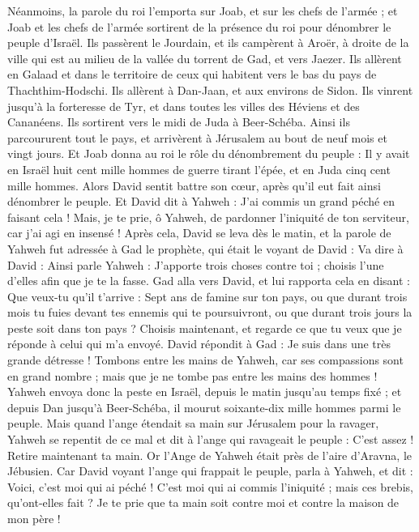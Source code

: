 \begin{multicols}{2}
Néanmoins, la parole du roi l’emporta sur Joab, et sur les chefs de l'armée ; et Joab et les chefs de l'armée sortirent de la présence du roi pour dénombrer le peuple d’Israël.
Ils passèrent le Jourdain, et ils campèrent à Aroër, à droite de la ville qui est au milieu de la vallée du torrent de Gad, et vers Jaezer.
Ils allèrent en Galaad et dans le territoire de ceux qui habitent vers le bas du pays de Thachthim-Hodschi. Ils allèrent à Dan-Jaan, et aux environs de Sidon.
Ils vinrent jusqu'à la forteresse de Tyr, et dans toutes les villes des Héviens et des Cananéens. Ils sortirent vers le midi de Juda à Beer-Schéba.
Ainsi ils parcoururent tout le pays, et arrivèrent à Jérusalem au bout de neuf mois et vingt jours.
Et Joab donna au roi le rôle du dénombrement du peuple : Il y avait en Israël huit cent mille hommes de guerre tirant l'épée, et en Juda cinq cent mille hommes.
Alors David sentit battre son cœur, après qu'il eut fait ainsi dénombrer le peuple. Et David dit à Yahweh : J'ai commis un grand péché en faisant cela ! Mais, je te prie, ô Yahweh, de pardonner l'iniquité de ton serviteur, car j'ai agi en insensé !
Après cela, David se leva dès le matin, et la parole de Yahweh fut adressée à Gad le prophète, qui était le voyant de David :
Va dire à David : Ainsi parle Yahweh : J’apporte trois choses contre toi ; choisis l'une d’elles afin que je te la fasse.
Gad alla vers David, et lui rapporta cela en disant : Que veux-tu qu’il t'arrive : Sept ans de famine sur ton pays, ou que durant trois mois tu fuies devant tes ennemis qui te poursuivront, ou que durant trois jours la peste soit dans ton pays ? Choisis maintenant, et regarde ce que tu veux que je réponde à celui qui m'a envoyé.
David répondit à Gad : Je suis dans une très grande détresse ! Tombons entre les mains de Yahweh, car ses compassions sont en grand nombre ; mais que je ne tombe pas entre les mains des hommes !
Yahweh envoya donc la peste en Israël, depuis le matin jusqu'au temps fixé ; et depuis Dan jusqu'à Beer-Schéba, il mourut soixante-dix mille hommes parmi le peuple.
Mais quand l'ange étendait sa main sur Jérusalem pour la ravager, Yahweh se repentit de ce mal et dit à l'ange qui ravageait le peuple : C'est assez ! Retire maintenant ta main. Or l'Ange de Yahweh était près de l'aire d'Aravna, le Jébusien.
Car David voyant l'ange qui frappait le peuple, parla à Yahweh, et dit : Voici, c'est moi qui ai péché ! C’est moi qui ai commis l'iniquité ; mais ces brebis, qu'ont-elles fait ? Je te prie que ta main soit contre moi et contre la maison de mon père !

\end{multicols}
